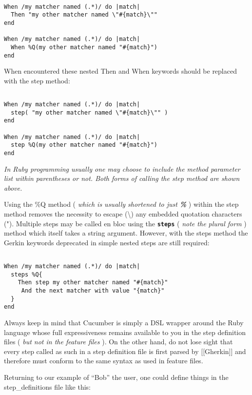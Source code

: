 \begin{verbatim}

When /my matcher named (.*)/ do |match|
  Then "my other matcher named \"#{match}\""
end

When /my matcher named (.*)/ do |match|
  When %Q(my other matcher named "#{match}")
end

\end{verbatim}
When encountered these nested Then and When keywords should be replaced with the step method:

\begin{verbatim}

When /my matcher named (.*)/ do |match|
  step( "my other matcher named \"#{match}\"" )
end

When /my matcher named (.*)/ do |match|
  step %Q(my other matcher named "#{match}")
end

\end{verbatim}
\emph{In Ruby programming usually one may choose to include the method parameter list within parentheses or not.  Both forms of calling the step method are shown above.}

Using the \%Q method ( \emph{which is usually shortened to just \textbf{\%}} ) within the step method removes the necessity to escape (\textbackslash{}) any embedded quotation characters (").  Multiple steps may be called en bloc using the \textbf{\verb+steps+} ( \emph{note the plural form} ) method which itself takes a string argument.  However, with the steps method the Gerkin keywords deprecated in simple nested steps are still required:
\begin{verbatim}

When /my matcher named (.*)/ do |match|
  steps %Q{
    Then step my other matcher named "#{match}" 
     And the next matcher with value "{match}"
  }
end

\end{verbatim}

Always keep in mind that Cucumber is simply a DSL wrapper around the Ruby language whose full expressiveness remains available to you in the step definition files ( \emph{but not in the feature files} ).  On the other hand, do not lose sight that every step called as such in a step definition file is first parsed by [[Gherkin]] and therefore must conform to the same syntax as used in feature files.

Returning to our example of ``Bob'' the user, one could define things in the step\_definitions file like this:


